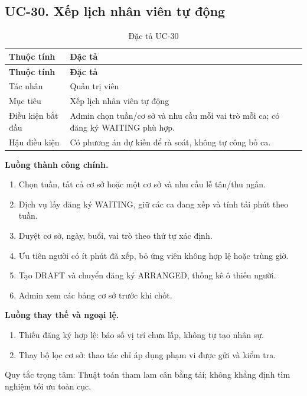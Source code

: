 \clearpage

\subsection{UC-30.\allowbreak{} Xếp lịch nhân viên tự động}
\label{uc:30}

{\small\setlength{\tabcolsep}{3pt}\renewcommand{\arraystretch}{1.12}
\begin{longtable}{@{}L{\textwidth-1.32pt\relax} L{\textwidth-4.68pt\relax}@{}}
\caption{Đặc tả UC-30}\\
\toprule
\textbf{Thuộc tính} & \textbf{Đặc tả}\\\midrule
\endfirsthead
\toprule
\textbf{Thuộc tính} & \textbf{Đặc tả}\\\midrule
\endhead
\bottomrule\endlastfoot
Tác nhân & Quản trị viên\\[3pt]
Mục tiêu & Xếp lịch nhân viên tự động\\[3pt]
Điều kiện bắt đầu & Admin chọn tuần/\allowbreak{}cơ sở và nhu cầu mỗi vai trò mỗi ca; có đăng ký WAITING phù hợp.\allowbreak{}\\[3pt]
Hậu điều kiện & Có phương án dự kiến để rà soát, không tự công bố ca.\allowbreak{}\\[3pt]
\end{longtable}}
\noindent\textbf{Luồng thành công chính.}
\begin{enumerate}
\item Chọn tuần, tất cả cơ sở hoặc một cơ sở và nhu cầu lễ tân/\allowbreak{}thu ngân.\allowbreak{}
\item Dịch vụ lấy đăng ký WAITING, giữ các ca đang xếp và tính tải phút theo tuần.\allowbreak{}
\item Duyệt cơ sở, ngày, buổi, vai trò theo thứ tự xác định.\allowbreak{}
\item Ưu tiên người có ít phút đã xếp, bỏ ứng viên không hợp lệ hoặc trùng giờ.\allowbreak{}
\item Tạo DRAFT và chuyển đăng ký ARRANGED, thống kê ô thiếu người.\allowbreak{}
\item Admin xem các bảng cơ sở trước khi chốt.\allowbreak{}
\end{enumerate}
\noindent\textbf{Luồng thay thế và ngoại lệ.}
\begin{enumerate}
\item Thiếu đăng ký hợp lệ:\allowbreak{} báo số vị trí chưa lấp, không tự tạo nhân sự.\allowbreak{}
\item Thay bộ lọc cơ sở:\allowbreak{} thao tác chỉ áp dụng phạm vi được gửi và kiểm tra.\allowbreak{}
\end{enumerate}
Quy tắc trọng tâm:\allowbreak{} Thuật toán tham lam cân bằng tải; không khẳng định tìm nghiệm tối ưu toàn cục.\allowbreak{}

